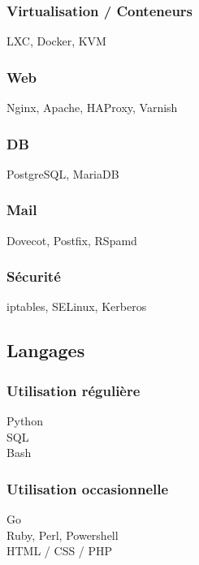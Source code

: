 \documentclass[a4paper]{tsacha-resume}
\begin{document}
\begin{minipage}[t]{0.25\textwidth}
  \subsubsection{Virtualisation / Conteneurs}
  LXC, Docker, KVM

  \subsubsection{Web}
  Nginx, Apache, HAProxy, Varnish

  \subsubsection{DB}
  PostgreSQL, MariaDB

  \subsubsection{Mail}
  Dovecot, Postfix, RSpamd

  \subsubsection{Sécurité}
  iptables, SELinux, Kerberos


  \subsection{Langages}
  \subsubsection{Utilisation régulière}
  Python\\
  SQL \\
  Bash

  \subsubsection{Utilisation occasionnelle}
  Go \\
  Ruby, Perl, Powershell\\
  HTML / CSS / PHP

\end{minipage}
\hfill
\end{document}
